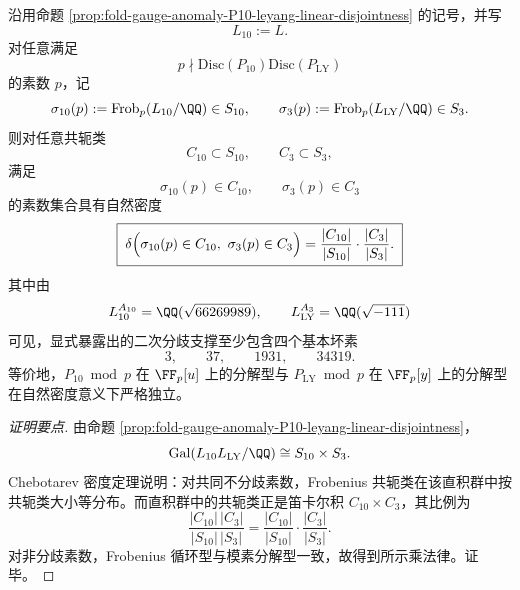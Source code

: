 \begin{corollary}\label{cor:fold-gauge-anomaly-P10-leyang-chebotarev-product-law}
沿用命题 \ref{prop:fold-gauge-anomaly-P10-leyang-linear-disjointness} 的记号，并写
\[
L_{10}:=L.
\]
对任意满足
\[
p\nmid \mathrm{Disc}(P_{10})\mathrm{Disc}(P_{\mathrm{LY}})
\]
的素数 \(p\)，记
\[
\sigma_{10}(p):=\mathrm{Frob}_p(L_{10}/\QQ)\in S_{10},
\qquad
\sigma_{3}(p):=\mathrm{Frob}_p(L_{\mathrm{LY}}/\QQ)\in S_{3}.
\]
则对任意共轭类
\[
C_{10}\subset S_{10},
\qquad
C_{3}\subset S_{3},
\]
满足
\[
\sigma_{10}(p)\in C_{10},
\qquad
\sigma_{3}(p)\in C_{3}
\]
的素数集合具有自然密度
\[
\boxed{\;
\delta\Bigl(
\sigma_{10}(p)\in C_{10},\ \sigma_{3}(p)\in C_{3}
\Bigr)
=
\frac{|C_{10}|}{|S_{10}|}\cdot\frac{|C_{3}|}{|S_{3}|}.\;}
\]
其中由
\[
L_{10}^{A_{10}}=\QQ(\sqrt{66269989}),
\qquad
L_{\mathrm{LY}}^{A_3}=\QQ(\sqrt{-111})
\]
可见，显式暴露出的二次分歧支撑至少包含四个基本坏素
\[
3,\qquad 37,\qquad 1931,\qquad 34319.
\]
等价地，\(P_{10}\bmod p\) 在 \(\FF_p[u]\) 上的分解型与 \(P_{\mathrm{LY}}\bmod p\) 在 \(\FF_p[y]\) 上的分解型在自然密度意义下严格独立。
\end{corollary}
\begin{proof}[证明要点]
由命题 \ref{prop:fold-gauge-anomaly-P10-leyang-linear-disjointness}，
\[
\mathrm{Gal}(L_{10}L_{\mathrm{LY}}/\QQ)\cong S_{10}\times S_3.
\]
Chebotarev 密度定理说明：对共同不分歧素数，Frobenius 共轭类在该直积群中按共轭类大小等分布。而直积群中的共轭类正是笛卡尔积 \(C_{10}\times C_3\)，其比例为
\[
\frac{|C_{10}|\,|C_3|}{|S_{10}|\,|S_3|}
=
\frac{|C_{10}|}{|S_{10}|}\cdot\frac{|C_3|}{|S_3|}.
\]
对非分歧素数，Frobenius 循环型与模素分解型一致，故得到所示乘法律。证毕。
\end{proof}

